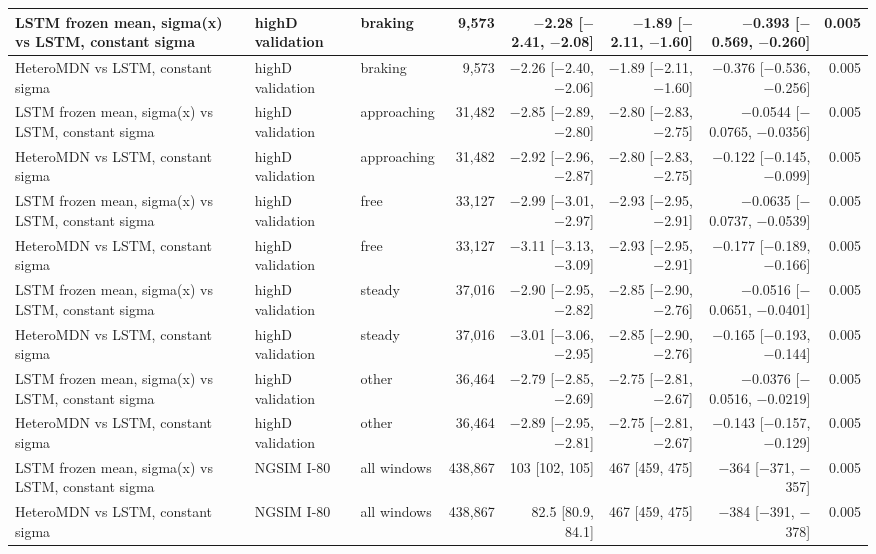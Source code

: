 \begin{longtable}{lllrrrrr}
\midrule
LSTM frozen mean, sigma(x) vs LSTM, constant sigma & highD validation & braking & 9,573 & $-$2.28 [$-$2.41, $-$2.08] & $-$1.89 [$-$2.11, $-$1.60] & $-$0.393 [$-$0.569, $-$0.260] & 0.005 \\
\midrule
HeteroMDN vs LSTM, constant sigma & highD validation & braking & 9,573 & $-$2.26 [$-$2.40, $-$2.06] & $-$1.89 [$-$2.11, $-$1.60] & $-$0.376 [$-$0.536, $-$0.256] & 0.005 \\
\midrule
LSTM frozen mean, sigma(x) vs LSTM, constant sigma & highD validation & approaching & 31,482 & $-$2.85 [$-$2.89, $-$2.80] & $-$2.80 [$-$2.83, $-$2.75] & $-$0.0544 [$-$0.0765, $-$0.0356] & 0.005 \\
\midrule
HeteroMDN vs LSTM, constant sigma & highD validation & approaching & 31,482 & $-$2.92 [$-$2.96, $-$2.87] & $-$2.80 [$-$2.83, $-$2.75] & $-$0.122 [$-$0.145, $-$0.099] & 0.005 \\
\midrule
LSTM frozen mean, sigma(x) vs LSTM, constant sigma & highD validation & free & 33,127 & $-$2.99 [$-$3.01, $-$2.97] & $-$2.93 [$-$2.95, $-$2.91] & $-$0.0635 [$-$0.0737, $-$0.0539] & 0.005 \\
\midrule
HeteroMDN vs LSTM, constant sigma & highD validation & free & 33,127 & $-$3.11 [$-$3.13, $-$3.09] & $-$2.93 [$-$2.95, $-$2.91] & $-$0.177 [$-$0.189, $-$0.166] & 0.005 \\
\midrule
LSTM frozen mean, sigma(x) vs LSTM, constant sigma & highD validation & steady & 37,016 & $-$2.90 [$-$2.95, $-$2.82] & $-$2.85 [$-$2.90, $-$2.76] & $-$0.0516 [$-$0.0651, $-$0.0401] & 0.005 \\
\midrule
HeteroMDN vs LSTM, constant sigma & highD validation & steady & 37,016 & $-$3.01 [$-$3.06, $-$2.95] & $-$2.85 [$-$2.90, $-$2.76] & $-$0.165 [$-$0.193, $-$0.144] & 0.005 \\
\midrule
LSTM frozen mean, sigma(x) vs LSTM, constant sigma & highD validation & other & 36,464 & $-$2.79 [$-$2.85, $-$2.69] & $-$2.75 [$-$2.81, $-$2.67] & $-$0.0376 [$-$0.0516, $-$0.0219] & 0.005 \\
\midrule
HeteroMDN vs LSTM, constant sigma & highD validation & other & 36,464 & $-$2.89 [$-$2.95, $-$2.81] & $-$2.75 [$-$2.81, $-$2.67] & $-$0.143 [$-$0.157, $-$0.129] & 0.005 \\
\midrule
LSTM frozen mean, sigma(x) vs LSTM, constant sigma & NGSIM I-80 & all windows & 438,867 & 103 [102, 105] & 467 [459, 475] & $-$364 [$-$371, $-$357] & 0.005 \\
\midrule
HeteroMDN vs LSTM, constant sigma & NGSIM I-80 & all windows & 438,867 & 82.5 [80.9, 84.1] & 467 [459, 475] & $-$384 [$-$391, $-$378] & 0.005 \\

\end{longtable}
